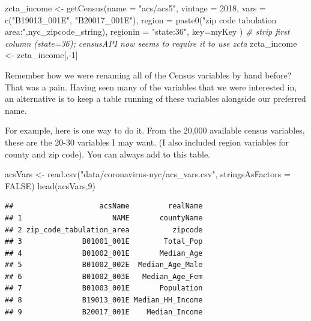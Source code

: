 \documentclass[
  openany]{book}
\newenvironment{Shaded}{\begin{snugshade}}{\end{snugshade}}
\newcommand{\AttributeTok}[1]{\textcolor[rgb]{0.77,0.63,0.00}{#1}}
\newcommand{\CommentTok}[1]{\textcolor[rgb]{0.56,0.35,0.01}{\textit{#1}}}
\newcommand{\ConstantTok}[1]{\textcolor[rgb]{0.00,0.00,0.00}{#1}}
\newcommand{\DecValTok}[1]{\textcolor[rgb]{0.00,0.00,0.81}{#1}}
\newcommand{\FunctionTok}[1]{\textcolor[rgb]{0.00,0.00,0.00}{#1}}
\newcommand{\NormalTok}[1]{#1}
\newcommand{\OtherTok}[1]{\textcolor[rgb]{0.56,0.35,0.01}{#1}}
\newcommand{\SpecialCharTok}[1]{\textcolor[rgb]{0.00,0.00,0.00}{#1}}
\newcommand{\StringTok}[1]{\textcolor[rgb]{0.31,0.60,0.02}{#1}}
\begin{document}
\begin{Shaded}
\begin{Highlighting}[]
\NormalTok{zcta\_income }\OtherTok{\textless{}{-}} \FunctionTok{getCensus}\NormalTok{(}\AttributeTok{name =} \StringTok{"acs/acs5"}\NormalTok{,}
                         \AttributeTok{vintage =} \DecValTok{2018}\NormalTok{,}
                         \AttributeTok{vars =} \FunctionTok{c}\NormalTok{(}\StringTok{"B19013\_001E"}\NormalTok{, }\StringTok{"B20017\_001E"}\NormalTok{),}
                         \AttributeTok{region =} \FunctionTok{paste0}\NormalTok{(}\StringTok{"zip code tabulation area:"}\NormalTok{,nyc\_zipcode\_string),}
                         \AttributeTok{regionin =} \StringTok{"state:36"}\NormalTok{,}
                         \AttributeTok{key=}\NormalTok{myKey}
\NormalTok{                         )}
\CommentTok{\# strip first column (state=36); censusAPI now seems to require it to use zcta}
\NormalTok{zcta\_income }\OtherTok{\textless{}{-}}\NormalTok{ zcta\_income[,}\SpecialCharTok{{-}}\DecValTok{1}\NormalTok{]}
\end{Highlighting}
\end{Shaded}

Remember how we were renaming all of the Census variables by hand before? That was a pain. Having seen many of the variables that we were interested in, an alternative is to keep a table running of these variables alongside our preferred name.

For example, here is one way to do it. From the 20,000 available census variables, these are the 20-30 variables I may want. (I also included region variables for county and zip code). You can always add to this table.

\begin{Shaded}
\begin{Highlighting}[]
\NormalTok{acsVars }\OtherTok{\textless{}{-}} \FunctionTok{read.csv}\NormalTok{(}\StringTok{"data/coronavirus{-}nyc/acs\_vars.csv"}\NormalTok{, }\AttributeTok{stringsAsFactors =} \ConstantTok{FALSE}\NormalTok{)}
\FunctionTok{head}\NormalTok{(acsVars,}\DecValTok{9}\NormalTok{)}
\end{Highlighting}
\end{Shaded}

\begin{verbatim}
##                    acsName         realName
## 1                     NAME       countyName
## 2 zip_code_tabulation_area          zipcode
## 3              B01001_001E        Total_Pop
## 4              B01002_001E       Median_Age
## 5              B01002_002E  Median_Age_Male
## 6              B01002_003E   Median_Age_Fem
## 7              B01003_001E       Population
## 8              B19013_001E Median_HH_Income
## 9              B20017_001E    Median_Income
\end{verbatim}
\end{document}
